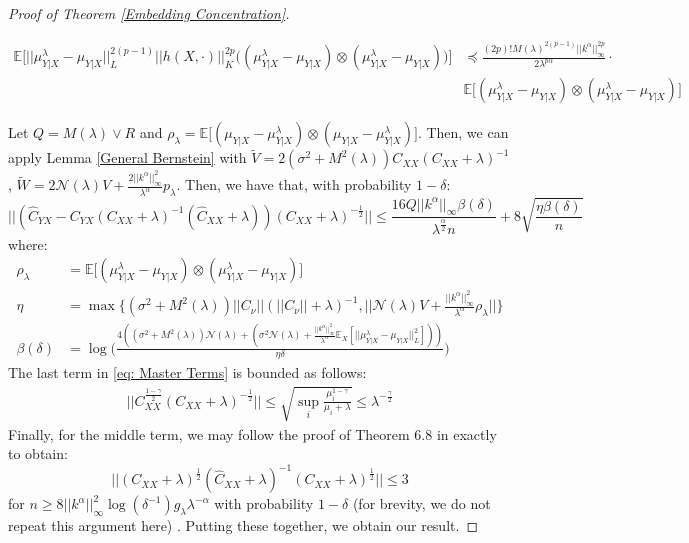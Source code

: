 \documentclass[accepted]{article}
\theoremstyle{definition}
\begin{document}
\begin{proof}[Proof of Theorem \ref{Embedding Concentration}]
\begin{small}
\begin{align*}
    \mathbb{E}\Big[||\mu^{\lambda}_{Y|X} - \mu_{Y|X}||^{2(p - 1)}_L ||h(X, \cdot)||_K^{2p} \Big((\mu^{\lambda}_{Y|X} - \mu_{Y|X}) \otimes (\mu^{\lambda}_{Y|X} - \mu_{Y|X})\Big)\Big] & \preccurlyeq \frac{(2p)! M(\lambda)^{2(p - 1)} ||k^{\alpha}||^{2p}_{\infty}}{2\lambda^{p\alpha}} \cdot \\
    & \mathbb{E}\Big[(\mu^{\lambda}_{Y|X} - \mu_{Y|X}) \otimes (\mu^{\lambda}_{Y|X} - \mu_{Y|X})\Big]
\end{align*}
\end{small}
Let $Q = M(\lambda) \vee R$ and $\rho_{\lambda} = \mathbb{E}\Big[(\mu_{Y | X} - \mu^{\lambda}_{Y | X}) \otimes (\mu_{Y | X} - \mu^{\lambda}_{Y | X})\Big]$. Then, we can apply Lemma \ref{General Bernstein} with $\tilde{V} = 2(\sigma^2 + M^2(\lambda))C_{XX}(C_{XX} + \lambda)^{-1}$, $\tilde{W} = 2\mathcal{N}(\lambda)V + \frac{2||k^{\alpha}||^2_{\infty}}{\lambda^{\alpha}}p_{\lambda}$. Then, we have that, with probability $1 - \delta$:
\begin{equation*}
    ||(\hat{C}_{YX} - C_{YX}(C_{XX} + \lambda)^{-1}(\hat{C}_{XX} + \lambda))(C_{XX} + \lambda)^{-\frac{1}{2}}|| \leq \frac{16Q||k^{\alpha}||_{\infty}\beta(\delta)}{\lambda^{\frac{\alpha}{2}}n} + 8\sqrt{\frac{\eta\beta(\delta)}{n}}
\end{equation*}
where:
\begin{align*}
    \rho_{\lambda} & = \mathbb{E}\Big[(\mu^{\lambda}_{Y|X} - \mu_{Y|X}) \otimes (\mu^{\lambda}_{Y|X} - \mu_{Y|X})\Big] \\
    \eta & = \max\{(\sigma^2 + M^2(\lambda))||C_{\nu}||(||C_{\nu}|| + \lambda)^{-1}, ||\mathcal{N}(\lambda)V + \frac{||k^{\alpha}||^2_{\infty}}{\lambda^{\alpha}}\rho_{\lambda}||\} \\
    \beta(\delta) & = \log \Big(\frac{4((\sigma^2 + M^2(\lambda))\mathcal{N}(\lambda) + (\sigma^2 \mathcal{N}(\lambda) + \frac{||k^{\alpha}||^2_{\infty}}{\lambda^{\alpha}}\mathbb{E}_X[||\mu^{\lambda}_{Y|X} - \mu_{Y|X}||_L^2]))}{\eta \delta}\Big)
\end{align*}
The last term in \eqref{eq: Master Terms} is bounded as follows:
\begin{align*}
    ||C^{\frac{1 -\gamma}{2}}_{XX}(C_{XX} + \lambda)^{-\frac{1}{2}}|| \leq \sqrt{\sup_i \frac{\mu_i^{1 - \gamma}}{\mu_i + \lambda}} \leq \lambda^{-\frac{\gamma}{2}}
\end{align*}
Finally, for the middle term, we may follow the proof of Theorem 6.8 in \cite{fischer2020sobolev} exactly to obtain:
\begin{equation*}
    ||(C_{XX} + \lambda)^{\frac{1}{2}}(\hat{C}_{XX} + \lambda)^{-1}(C_{XX} + \lambda)^{\frac{1}{2}}|| \leq 3
\end{equation*}
for $n \geq 8||k^{\alpha}||^2_{\infty}\log(\delta^{-1}) g_{\lambda}\lambda^{-\alpha}$ with probability $1 - \delta$ (for brevity, we do not repeat this argument here) . Putting these together, we obtain our result. 
\end{proof}
\end{document}
